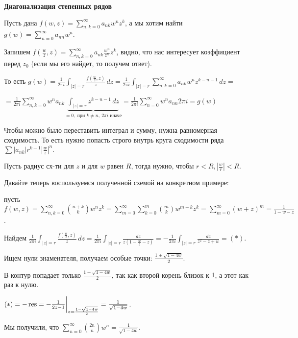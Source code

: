 \begin{example}
    \textbf{Диагонализация степенных рядов}

    Пусть дана $f(w, z) = \sum_{n, k = 0}^{\infty} a_{nk} w^n z^k$, а мы хотим найти $g(w) = \sum_{n = 0}^{\infty} a_{nn} w^n$.

    Запишем $f(\frac{w}{z}, z) = \sum_{n, k = 0}^{\infty} a_{nk} \frac{w^n}{z^n} z^k$, видно, что нас интересует коэффициент перед $z_0$ (если мы его найдет, то получем ответ).


    То есть $g(w) = \frac{1}{2\pi i} \int_{|z| = r} \frac{f(\frac{w}{z}, z)}{z} \, dz = \frac{1}{2\pi i} \int_{|z| = r} \sum_{n, k = 0}^{\infty} a_{nk} w^n z^{k - n - 1} \, dz =$

    $= \frac{1}{2\pi i} \sum_{n, k = 0}^{\infty} w^n a_{nk} \underbrace{\int_{|z| = r} z^{k - n - 1} \, dz}_{=0, \text{ при } k \not = n, \ 2\pi i \text{ иначе}} = \frac{1}{2\pi i} \sum_{n = 0}^{\infty} w^n a_{nn} 2\pi i = g(w)$


    Чтобы можно было переставить интеграл и сумму, нужна равномерная сходимость. То есть нужно попасть строго внутрь круга сходимости ряда $\sum |a_{nk}| r^{k-1} \left |\frac{w}{z} \right |^n$.

    Пусть радиус сх-ти для $z$ и для $w$ равен $R$, тогда нужно, чтобы $r < R, \left|\frac{w}{r}\right| < R$.


    \bigskip

    Давайте теперь воспользуемся полученной схемой на конкретном примере:

    пусть $f(w, z) = \sum_{n, k = 0}^{\infty} \binom{n+k}{k}w^nz^k = \sum_{m = 0}^{\infty} \sum_{k = 0}^{m} \binom{m}{k} w^{m - k}z^k = \sum_{m = 0}^{\infty} (w + z)^m = \frac{1}{1 - w - z}$.


    Найдем $\frac{1}{2\pi i} \int_{|z| = r} \frac{f(\frac{w}{z}, z)}{z} \, dz = \frac{1}{2\pi i} \int_{|z| = r} \frac{dz}{z \left(1 - \frac{w}{z} - z\right)} = -\frac{1}{2\pi i} \int_{|z| = r} \frac{dz}{z^2 - z + w} = (*)$.

    Ищем нули знаменателя, получаем особые точки: $\frac{1 \pm \sqrt{1 - 4w}}{2}$.

    В контур попадает только $\frac{1 - \sqrt{1 - 4w}}{2}$, так как второй корень близок к $1$, а этот как раз к нулю.

    $(*) = - \operatorname{res} = -\frac{1}{2z - 1} \bigg |_{z = \frac{1 - \sqrt{1 - 4w}}{2}} = \frac{1}{\sqrt{1 - 4w}}$.

    Мы получили, что $\sum_{n=0}^{\infty} \binom{2n}{n} w^n = \frac{1}{\sqrt{1 - 4 w}}$.

\end{example}

